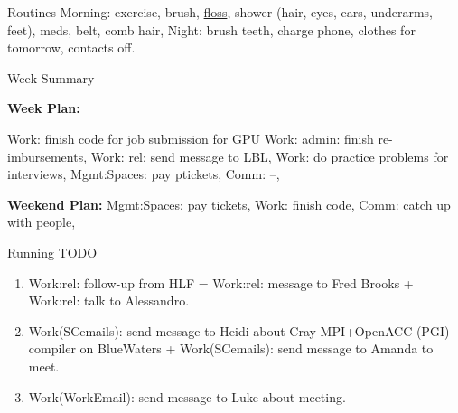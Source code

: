 \begin{frame}
\begin{columns}
    \begin{column}{0.50\linewidth}

      \begin{block}{Routines}
        Morning: exercise, brush, \underline{floss}, shower (hair, eyes, ears,
        underarms, feet), meds,  belt, comb hair, Night: brush teeth, charge
        phone, clothes for tomorrow, contacts off.  
      \end{block}

      \begin{block}{Week Summary}
        {\tiny \textbf{Week Plan:} 

          Work: finish code for job submission for GPU 
          Work: admin: finish re-imbursements, 
          Work: rel: send message to LBL, 
          Work: do practice problems for interviews, 
          Mgmt:Spaces: pay ptickets, 
          Comm: --, 
          
        } 

        {\tiny \textbf{Weekend Plan:}  Mgmt:Spaces: pay tickets, Work:
          finish code, Comm: catch up with people, 
      }

      \end{block}


      \begin{block}{Running TODO} %
        \begin{enumerate}

        \tiny \item \small Work:rel: follow-up from HLF = Work:rel: message to
          Fred Brooks + Work:rel: talk to Alessandro. 


        \item \tiny Work(SCemails): send message to Heidi about Cray
         MPI+OpenACC (PGI) compiler on BlueWaters +
         Work(SCemails): send message to Amanda to meet. 

       \item \tiny Work(WorkEmail): send message to Luke about
         meeting. 



\end{enumerate}
\end{block}
\end{column}
\end{columns}
\end{frame}
